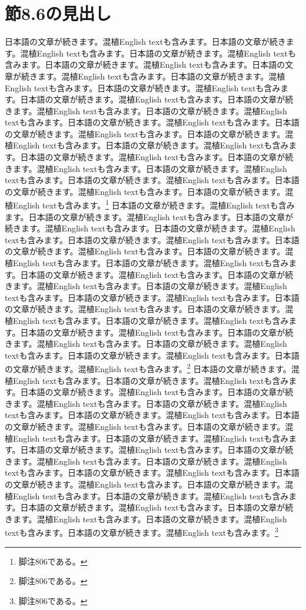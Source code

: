 \documentclass[pdflatex,book]{jlreq}
\begin{document}
\section{節8.6の見出し}
日本語の文章が続きます。混植English textも含みます。日本語の文章が続きます。混植English textも含みます。日本語の文章が続きます。混植English textも含みます。日本語の文章が続きます。混植English textも含みます。日本語の文章が続きます。混植English textも含みます。日本語の文章が続きます。混植English textも含みます。日本語の文章が続きます。混植English textも含みます。日本語の文章が続きます。混植English textも含みます。日本語の文章が続きます。混植English textも含みます。日本語の文章が続きます。混植English textも含みます。日本語の文章が続きます。混植English textも含みます。日本語の文章が続きます。混植English textも含みます。日本語の文章が続きます。混植English textも含みます。日本語の文章が続きます。混植English textも含みます。日本語の文章が続きます。混植English textも含みます。日本語の文章が続きます。混植English textも含みます。日本語の文章が続きます。混植English textも含みます。日本語の文章が続きます。混植English textも含みます。日本語の文章が続きます。混植English textも含みます。日本語の文章が続きます。混植English textも含みます。\footnote{脚注806である。}
日本語の文章が続きます。混植English textも含みます。日本語の文章が続きます。混植English textも含みます。日本語の文章が続きます。混植English textも含みます。日本語の文章が続きます。混植English textも含みます。日本語の文章が続きます。混植English textも含みます。日本語の文章が続きます。混植English textも含みます。日本語の文章が続きます。混植English textも含みます。日本語の文章が続きます。混植English textも含みます。日本語の文章が続きます。混植English textも含みます。日本語の文章が続きます。混植English textも含みます。日本語の文章が続きます。混植English textも含みます。日本語の文章が続きます。混植English textも含みます。日本語の文章が続きます。混植English textも含みます。日本語の文章が続きます。混植English textも含みます。日本語の文章が続きます。混植English textも含みます。日本語の文章が続きます。混植English textも含みます。日本語の文章が続きます。混植English textも含みます。日本語の文章が続きます。混植English textも含みます。日本語の文章が続きます。混植English textも含みます。日本語の文章が続きます。混植English textも含みます。\footnote{脚注806である。}
日本語の文章が続きます。混植English textも含みます。日本語の文章が続きます。混植English textも含みます。日本語の文章が続きます。混植English textも含みます。日本語の文章が続きます。混植English textも含みます。日本語の文章が続きます。混植English textも含みます。日本語の文章が続きます。混植English textも含みます。日本語の文章が続きます。混植English textも含みます。日本語の文章が続きます。混植English textも含みます。日本語の文章が続きます。混植English textも含みます。日本語の文章が続きます。混植English textも含みます。日本語の文章が続きます。混植English textも含みます。日本語の文章が続きます。混植English textも含みます。日本語の文章が続きます。混植English textも含みます。日本語の文章が続きます。混植English textも含みます。日本語の文章が続きます。混植English textも含みます。日本語の文章が続きます。混植English textも含みます。日本語の文章が続きます。混植English textも含みます。日本語の文章が続きます。混植English textも含みます。日本語の文章が続きます。混植English textも含みます。日本語の文章が続きます。混植English textも含みます。\footnote{脚注806である。}
\end{document}
